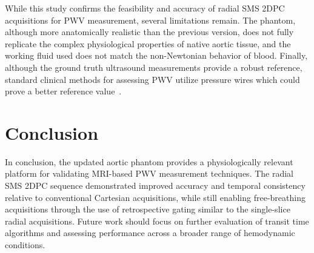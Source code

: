 While this study confirms the feasibility and accuracy of radial SMS 2DPC acquisitions for PWV measurement, several limitations remain. The phantom, although more anatomically realistic than the previous version, does not fully replicate the complex physiological properties of native aortic tissue, and the working fluid used does not match the non-Newtonian behavior of blood. Finally, although the ground truth ultrasound measurements provide a robust reference, standard clinical methods for assessing PWV utilize pressure wires which could prove a better reference value~\cite{doguiMeasurementAorticArch2011}.

\section{Conclusion}\label{sec:phantom_conclusion}
In conclusion, the updated aortic phantom provides a physiologically relevant platform for validating MRI-based PWV measurement techniques. The radial SMS 2DPC sequence demonstrated improved accuracy and temporal consistency relative to conventional Cartesian acquisitions, while still enabling free-breathing acquisitions through the use of retrospective gating similar to the single-slice radial acquisitions. Future work should focus on further evaluation of transit time algorithms and assessing performance across a broader range of hemodynamic conditions.